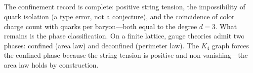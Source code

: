 \documentclass[11pt,a4paper]{book}
\begin{document}
\begin{code}
\<%
\\
%
\\[\AgdaEmptyExtraSkip]%
\>[0]\AgdaSpace{}%
\AgdaSymbol{:}\AgdaSpace{}%
\<%
\\
\>[0]\AgdaSpace{}%
\AgdaSymbol{=}\AgdaSpace{}%
\<%
\\
\>[0][@{}l@{\AgdaIndent{0}}]%
\>[2]\AgdaSymbol{\{}\AgdaSpace{}%
%
\>[22]\AgdaSymbol{=}\AgdaSpace{}%
\<%
\\
%
\>[2]\AgdaSymbol{;}\AgdaSpace{}%
%
\>[22]\AgdaSymbol{=}\AgdaSpace{}%
\<%
\\
%
\>[2]\AgdaSymbol{;}\AgdaSpace{}%
\AgdaSpace{}%
\AgdaSymbol{=}\AgdaSpace{}%
\<%
\\
%
\>[2]\AgdaSymbol{;}\AgdaSpace{}%
%
\>[22]\AgdaSymbol{=}\AgdaSpace{}%
\<%
\\
%
\>[2]\AgdaSymbol{;}\AgdaSpace{}%
\AgdaSpace{}%
\AgdaSymbol{=}\AgdaSpace{}%
\<%
\\
%
\>[2]\AgdaSymbol{;}\AgdaSpace{}%
%
\>[22]\AgdaSymbol{=}\AgdaSpace{}%
\AgdaSpace{}%
\AgdaSymbol{\}}\<%
\end{code}

The confinement record is complete: positive string tension, the
impossibility of quark isolation (a type error, not a conjecture),
and the coincidence of color charge count with quarks per baryon---both
equal to the degree $d = 3$. What remains is the phase classification.
On a finite lattice, gauge theories admit two phases: confined (area
law) and deconfined (perimeter law). The $K_4$ graph forces the
confined phase because the string tension is positive and
non-vanishing---the area law holds by construction.
\end{document}

